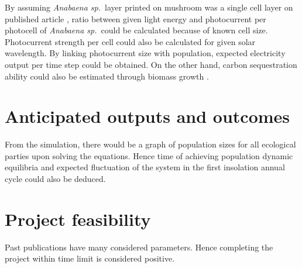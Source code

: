 \documentclass[a4paper, 11pt]{article}
\newcommand{\As}{\textit{Anabaena sp.}}
\begin{document}
By assuming \As\ layer printed on mushroom was a single cell layer on published article \autocite{joshi2018bacterial}, ratio between given light energy and photocurrent per photocell of \As\ could be calculated because of known cell size.  Photocurrent strength per cell could also be calculated for given solar wavelength.  By linking photocurrent size with population, expected electricity output per time step could be obtained.  On the other hand, carbon sequestration ability could also be estimated through biomass growth \autocite{markou2014microalgal}.

\section{Anticipated outputs and outcomes}
From the simulation, there would be a graph of population sizes for all ecological parties upon solving the equations.  Hence time of achieving population dynamic equilibria and expected fluctuation of the system in the first insolation annual cycle could also be deduced.

\section{Project feasibility}
Past publications have many considered parameters.  Hence completing the project within time limit is considered positive.
\end{document}
